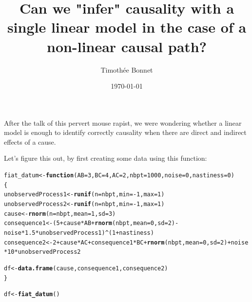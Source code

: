 \documentclass{article}\usepackage[]{graphicx}\usepackage[]{color}
\title{Can we "infer" causality with a single linear model in the case of a non-linear causal path?}
\date{\today} %
\author{Timoth\'{e}e Bonnet}
\makeatletter
\newcommand{\hlnum}[1]{\textcolor[rgb]{0.686,0.059,0.569}{#1}}%
\newcommand{\hlopt}[1]{\textcolor[rgb]{0,0,0}{#1}}%
\newcommand{\hlstd}[1]{\textcolor[rgb]{0.345,0.345,0.345}{#1}}%
\newcommand{\hlkwa}[1]{\textcolor[rgb]{0.161,0.373,0.58}{\textbf{#1}}}%
\newcommand{\hlkwb}[1]{\textcolor[rgb]{0.69,0.353,0.396}{#1}}%
\newcommand{\hlkwc}[1]{\textcolor[rgb]{0.333,0.667,0.333}{#1}}%
\newcommand{\hlkwd}[1]{\textcolor[rgb]{0.737,0.353,0.396}{\textbf{#1}}}%
\newenvironment{kframe}{%
 \def\at@end@of@kframe{}%
 \ifinner\ifhmode%
  \def\at@end@of@kframe{\end{minipage}}%
  \begin{minipage}{\columnwidth}%
 \fi\fi%
 \def\FrameCommand##1{\hskip\@totalleftmargin \hskip-\fboxsep
 \colorbox{shadecolor}{##1}\hskip-\fboxsep
     \hskip-\linewidth \hskip-\@totalleftmargin \hskip\columnwidth}%
 \MakeFramed {\advance\hsize-\width
   \@totalleftmargin\z@ \linewidth\hsize
   \@setminipage}}%
 {\par\unskip\endMakeFramed%
 \at@end@of@kframe}
\newenvironment{knitrout}{}{} %
\makeatother
\begin{document}
\maketitle

After the talk of this pervert mouse rapist, we were wondering whether a linear model is enough to identify correctly causality when there are direct and indirect effects of a cause. 


Let's figure this out, by first creating some data using this function:

\begin{knitrout}
\color{fgcolor}\begin{kframe}
\begin{alltt}
\hlstd{fiat_datum}\hlkwb{<-}\hlkwa{function}\hlstd{(}\hlkwc{AB}\hlstd{=}\hlnum{3}\hlstd{,}\hlkwc{BC}\hlstd{=}\hlnum{4}\hlstd{,}\hlkwc{AC}\hlstd{=}\hlnum{2}\hlstd{,}\hlkwc{nbpt}\hlstd{=}\hlnum{1000}\hlstd{,}\hlkwc{noise}\hlstd{=}\hlnum{0}\hlstd{,} \hlkwc{nastiness}\hlstd{=}\hlnum{0}\hlstd{)}
\hlstd{\{}
\hlstd{unobservedProcess1}\hlkwb{<-}\hlkwd{runif}\hlstd{(}\hlkwc{n}\hlstd{=nbpt,}\hlkwc{min} \hlstd{=} \hlopt{-}\hlnum{1}\hlstd{,}\hlkwc{max}\hlstd{=}\hlnum{1}\hlstd{)}
\hlstd{unobservedProcess2}\hlkwb{<-}\hlkwd{runif}\hlstd{(}\hlkwc{n}\hlstd{=nbpt,}\hlkwc{min} \hlstd{=} \hlopt{-}\hlnum{1}\hlstd{,}\hlkwc{max}\hlstd{=}\hlnum{1}\hlstd{)}
\hlstd{cause}\hlkwb{<-}\hlkwd{rnorm}\hlstd{(}\hlkwc{n} \hlstd{= nbpt,}\hlkwc{mean}\hlstd{=}\hlnum{1}\hlstd{,}\hlkwc{sd}\hlstd{=}\hlnum{3}\hlstd{)}
\hlstd{consequence1}\hlkwb{<-}\hlstd{(}\hlnum{5}\hlopt{+}\hlstd{cause}\hlopt{*}\hlstd{AB}\hlopt{+}\hlkwd{rnorm}\hlstd{(nbpt,}\hlkwc{mean}\hlstd{=}\hlnum{0}\hlstd{,}\hlkwc{sd} \hlstd{=} \hlnum{2}\hlstd{)}\hlopt{-}\hlstd{noise}\hlopt{*}\hlnum{1.5}\hlopt{*}\hlstd{unobservedProcess1)}\hlopt{^}\hlstd{(}\hlnum{1}\hlopt{+}\hlstd{nastiness)}
\hlstd{consequence2}\hlkwb{<-}\hlnum{2}\hlopt{+}\hlstd{cause}\hlopt{*}\hlstd{AC}\hlopt{+}\hlstd{consequence1}\hlopt{*}\hlstd{BC}\hlopt{+}\hlkwd{rnorm}\hlstd{(nbpt,}\hlkwc{mean}\hlstd{=}\hlnum{0}\hlstd{,}\hlkwc{sd}\hlstd{=}\hlnum{2}\hlstd{)}\hlopt{+}\hlstd{noise}\hlopt{*}\hlnum{10}\hlopt{*}\hlstd{unobservedProcess2}

\hlstd{df}\hlkwb{<-}\hlkwd{data.frame}\hlstd{(cause, consequence1,consequence2)}
\hlstd{\}}

\hlstd{df}\hlkwb{<-}\hlkwd{fiat_datum}\hlstd{()}
\end{alltt}
\end{kframe}
\end{knitrout}
\end{document}
